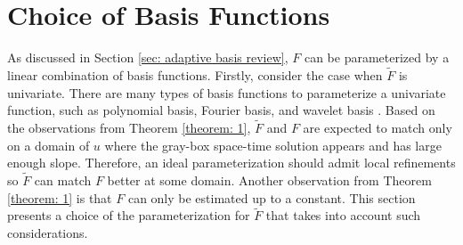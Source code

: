 \section{Choice of Basis Functions}
\label{sec: flux param}
As discussed in Section \ref{sec: adaptive basis review}, 
$F$ can be parameterized by a linear combination of basis functions.
Firstly, consider the case when $\tilde{F}$ is univariate. 
There are many types of basis
functions to parameterize a univariate function, such as polynomial basis, Fourier basis, and
wavelet basis \cite{wavelet mallat}. 
Based on the observations from Theorem \ref{theorem: 1}, $\tilde{F}$ and $F$
are expected to match only on a domain of $u$ 
where the gray-box space-time solution appears and has large enough slope.
Therefore, an ideal parameterization should 
admit local refinements so $\tilde{F}$ can match $F$ better at some domain.
Another observation from Theorem \ref{theorem: 1} is that $F$ can only be estimated up to 
a constant.
This section presents a choice of the parameterization for $\tilde{F}$ that takes into account
such considerations.\\

